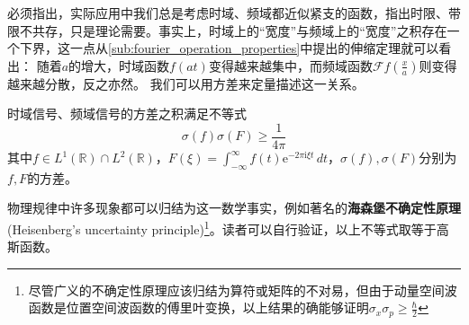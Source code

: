 必须指出，实际应用中我们总是考虑时域、频域都近似紧支的函数，指出时限、带限不共存，只是理论需要。事实上，时域上的“宽度”与频域上的“宽度”之积存在一个下界，这一点从\ref{sub:fourier_operation_properties}中提出的伸缩定理就可以看出：
随着$a$的增大，时域函数$f(at)$变得越来越集中，而频域函数$\mathcal{F} f\left(\frac{x}{a}\right)$则变得越来越分散，反之亦然。
我们可以用方差来定量描述这一关系。
\begin{theorem}
    时域信号、频域信号的方差之积满足不等式
    \[\sigma(f)\sigma(F)\geq \frac{1}{4\pi}\]
    其中$f\in L^1(\mathbb{R} )\cap L^2(\mathbb{R} )$，$F(\xi)=\int_{-\infty}^{\infty}f(t)\mathrm{e}^{-2\pi \mathrm{i}\xi t}\,dt$，$\sigma(f),\sigma(F)$分别为$f,F$的方差。
\end{theorem}
物理规律中许多现象都可以归结为这一数学事实，例如著名的\textbf{海森堡不确定性原理} (Heisenberg's uncertainty principle)\footnote{尽管广义的不确定性原理应该归结为算符或矩阵的不对易，但由于动量空间波函数是位置空间波函数的傅里叶变换，以上结果的确能够证明$\sigma_x \sigma_p\geq\frac{\hbar}{2}$}。读者可以自行验证，以上不等式取等于高斯函数。
